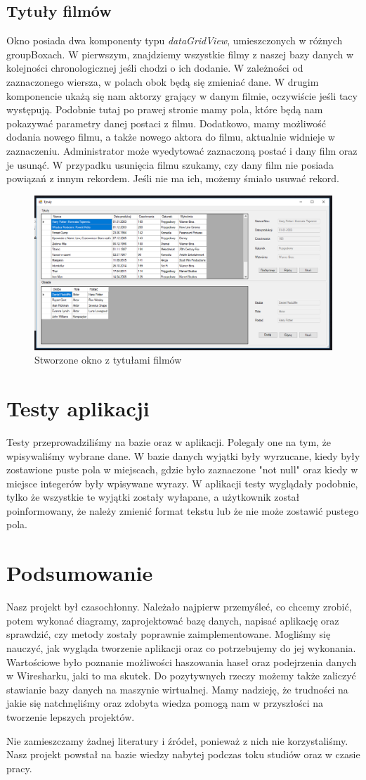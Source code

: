 \documentclass{article}
\begin{document}
\subsection{Tytuły filmów}
Okno posiada dwa komponenty typu \textit{dataGridView}, umieszczonych w różnych groupBoxach. W pierwszym, znajdziemy wszystkie filmy z naszej bazy danych w kolejności chronologicznej jeśli chodzi o ich dodanie. W zależności od zaznaczonego wiersza, w polach obok będą się zmieniać dane. W drugim komponencie ukażą się nam aktorzy grający w danym filmie, oczywiście jeśli tacy występują. Podobnie tutaj po prawej stronie mamy pola, które będą nam pokazywać parametry danej postaci z filmu. Dodatkowo, mamy możliwość dodania nowego filmu, a także nowego aktora do filmu, aktualnie widnieje w zaznaczeniu. Administrator może wyedytować zaznaczoną postać i dany film oraz je usunąć. W przypadku usunięcia filmu szukamy, czy dany film nie posiada powiązań z innym rekordem. Jeśli nie ma ich, możemy śmiało usuwać rekord.
\begin{figure}[!ht]
\centering
\includegraphics[width=12.5cm]{tytuly.PNG}
\caption{Stworzone okno z tytułami filmów}
\end{figure}
\section{Testy aplikacji}
Testy przeprowadziliśmy na bazie oraz w aplikacji. Polegały one na tym, że wpisywaliśmy wybrane dane.
W bazie danych wyjątki były wyrzucane, kiedy były zostawione puste pola w miejscach, gdzie było zaznaczone "not null" oraz kiedy w miejsce integerów były wpisywane wyrazy. 
W aplikacji testy wyglądały podobnie, tylko że wszystkie te wyjątki zostały wyłapane, a użytkownik został poinformowany, że należy zmienić format tekstu lub że nie może zostawić pustego pola.
\section{Podsumowanie}
Nasz projekt był czasochłonny. Należało najpierw przemyśleć, co chcemy zrobić, potem wykonać diagramy, zaprojektować bazę danych, napisać aplikację oraz sprawdzić, czy metody zostały poprawnie zaimplementowane.
	Mogliśmy się nauczyć, jak wygląda tworzenie aplikacji oraz co potrzebujemy do jej wykonania.
	Wartościowe było poznanie możliwości haszowania haseł oraz podejrzenia danych w Wiresharku, jaki to ma skutek.
	Do pozytywnych rzeczy możemy także zaliczyć stawianie bazy danych na maszynie wirtualnej.
	Mamy nadzieję, że trudności na jakie się natchnęliśmy oraz zdobyta wiedza pomogą nam w przyszłości na tworzenie lepszych projektów. 
	
	Nie zamieszczamy żadnej literatury i źródeł, ponieważ z nich nie korzystaliśmy. Nasz projekt powstał na bazie wiedzy nabytej podczas toku studiów oraz w czasie pracy.
\end{document}

